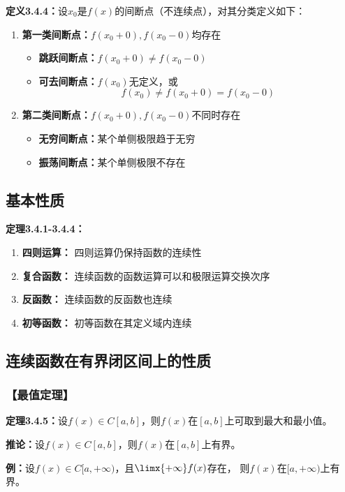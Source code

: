 {\bf 定义3.4.4：}设$x_0$是$f(x)$的间断点（不连续点），对其分类定义如下：
\begin{enumerate}[(1)]
  \setlength{\itemindent}{1cm}
  \item {\bf 第一类间断点：}$f(x_0+0),f(x_0-0)$均存在
  \begin{itemize}
    \item {\bf 跳跃间断点：}$f(x_0+0)\ne f(x_0-0)$
    \item {\bf 可去间断点：}$f(x_0)$无定义，或
    $$f(x_0)\ne f(x_0+0)=f(x_0-0)$$
  \end{itemize}
  \item {\bf 第二类间断点：}$f(x_0+0),f(x_0-0)$不同时存在
  \begin{itemize}
    \item {\bf 无穷间断点：}某个单侧极限趋于无穷
    \item {\bf 振荡间断点：}某个单侧极限不存在
  \end{itemize}
\end{enumerate}

\subsection{基本性质}

{\bf 定理3.4.1-3.4.4：}
\begin{enumerate}[(1)]
  \setlength{\itemindent}{1cm}
  \item {\bf 四则运算：} 四则运算仍保持函数的连续性 
  \item {\bf 复合函数：} 连续函数的函数运算可以和极限运算交换次序 
  \item {\bf 反函数：} 连续函数的反函数也连续 
  \item {\bf 初等函数：} 初等函数在其定义域内连续
\end{enumerate}

\subsection{连续函数在有界闭区间上的性质}

\subsubsection{【最值定理】}

{\bf 定理3.4.5：}设$f(x)\in C[a,b]$，则$f(x)$在$[a,b]$上可取到最大和最小值。

{\bf 推论：}设$f(x)\in C[a,b]$，则$f(x)$在$[a,b]$上有界。

{\bf 例：}设$f(x)\in C[a,+\infty)$，且$\limx{+\infty}f(x)$存在，
则$f(x)$在$[a,+\infty)$上有界。

